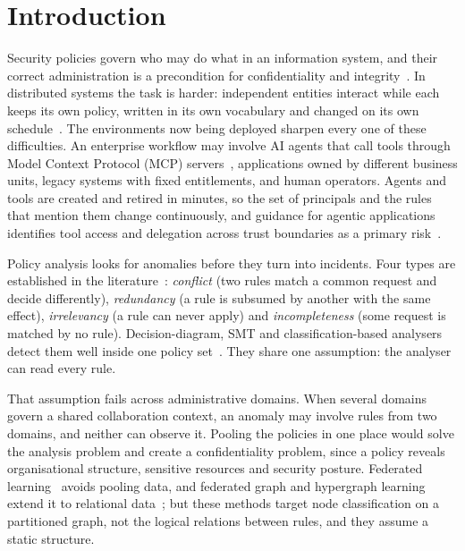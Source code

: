 \documentclass[preprint,12pt]{elsarticle}
\theoremstyle{definition}
\begin{document}
\section{Introduction}
\label{sec:intro}

Security policies govern who may do what in an information system, and their correct administration is a precondition for confidentiality and integrity~\cite{hu2014abac}. In distributed systems the task is harder: independent entities interact while each keeps its own policy, written in its own vocabulary and changed on its own schedule~\cite{zhao2012security,hu2018emerging,golightly2023securing}. The environments now being deployed sharpen every one of these difficulties. An enterprise workflow may involve AI agents that call tools through Model Context Protocol (MCP) servers~\cite{mcp2025spec}, applications owned by different business units, legacy systems with fixed entitlements, and human operators. Agents and tools are created and retired in minutes, so the set of principals and the rules that mention them change continuously, and guidance for agentic applications identifies tool access and delegation across trust boundaries as a primary risk~\cite{owasp2026agentic}.

Policy analysis looks for anomalies before they turn into incidents. Four types are established in the literature~\cite{hu2013discovery,shaikh2017data,davari2023classification}: \emph{conflict} (two rules match a common request and decide differently), \emph{redundancy} (a rule is subsumed by another with the same effect), \emph{irrelevancy} (a rule can never apply) and \emph{incompleteness} (some request is matched by no rule). Decision-diagram, SMT and classification-based analysers detect them well inside one policy set~\cite{fisler2005margrave,hu2013discovery,turkmen2017formal,shaikh2017data}. They share one assumption: the analyser can read every rule.

That assumption fails across administrative domains. When several domains govern a shared collaboration context, an anomaly may involve rules from two domains, and neither can observe it. Pooling the policies in one place would solve the analysis problem and create a confidentiality problem, since a policy reveals organisational structure, sensitive resources and security posture. Federated learning~\cite{mcmahan2017communication} avoids pooling data, and federated graph and hypergraph learning extend it to relational data~\cite{zhang2021subgraph,wang2022federatedscope,luo2024fedhgl}; but these methods target node classification on a partitioned graph, not the logical relations between rules, and they assume a static structure.
\end{document}
